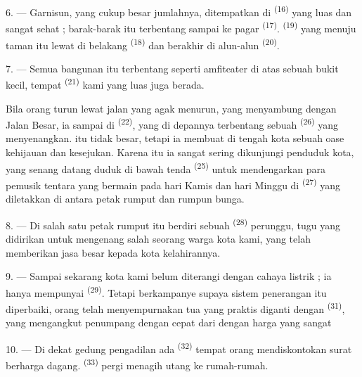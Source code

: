 6. --- Garnisun, yang cukup besar jumlahnya, ditempatkan di
 \textsuperscript{(16)} yang luas dan sangat sehat ;
barak-barak itu terbentang sampai ke pagar 
\textsuperscript{(17)}.  \textsuperscript{(19)} yang
menuju taman itu lewat di belakang 
\textsuperscript{(18)} dan berakhir di alun-alun 
\textsuperscript{(20)}.

7. --- Semua bangunan itu terbentang seperti amfiteater di atas sebuah
bukit kecil, tempat  \textsuperscript{(21)}
kami yang luas juga berada.

Bila orang turun lewat jalan yang agak menurun, yang menyambung dengan
Jalan Besar, ia sampai di  \textsuperscript{(22)},
yang di depannya terbentang sebuah 
\textsuperscript{(26)} yang menyenangkan.  itu
tidak besar, tetapi ia membuat di tengah kota sebuah oase kehijauan dan
kesejukan. Karena itu ia sangat sering dikunjungi penduduk kota, yang
senang datang duduk di bawah tenda 
\textsuperscript{(25)} untuk mendengarkan para pemusik tentara yang
bermain pada hari Kamis dan hari Minggu di 
\textsuperscript{(27)} yang diletakkan di antara petak rumput dan
rumpun bunga.

8. --- Di salah satu petak rumput itu berdiri sebuah 
\textsuperscript{(28)} perunggu, tugu yang didirikan untuk mengenang
salah seorang warga kota kami, yang telah memberikan jasa besar kepada
kota kelahirannya.

\VUsaut{4.0mm}
\VUsaut{3.4mm}

9. --- Sampai sekarang kota kami belum diterangi dengan cahaya
listrik ; ia hanya mempunyai 
\textsuperscript{(29)}. Tetapi  berkampanye
supaya sistem penerangan itu diperbaiki,  orang telah
menyempurnakan  
tua yang   praktis diganti dengan
 \textsuperscript{(31)}, yang mengangkut penumpang
dengan cepat dari 
dengan harga yang sangat 

10. --- Di dekat gedung pengadilan ada 
\textsuperscript{(32)} tempat orang mendiskontokan surat berharga
dagang.  \textsuperscript{(33)} pergi menagih
utang ke rumah-rumah.

